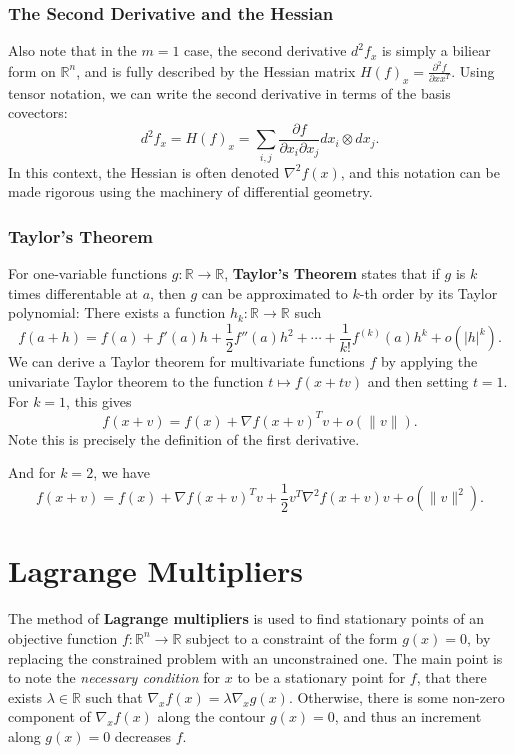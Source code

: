 \documentclass[reqno]{amsart}
\numberwithin{equation}{section}
\begin{document}
\subsubsection{The Second Derivative and the Hessian}

Also note that in the $m=1$ case, the second derivative $d^2f_x$ is simply a biliear form
on $\mathbb R^n$, and is fully described by the Hessian matrix $H(f)_x =
\frac{\partial^2 f}{\partial x x ^T}$. Using tensor notation, we can write the second derivative
in terms of the basis covectors:
$$
    d^2f_x = H(f)_x = \sum_{i,j} \frac{\partial f}{\partial x_i \partial x_j} dx_i \otimes dx_j.
$$
In this context, the Hessian is often denoted $\nabla^2f(x)$, and this notation can be made
rigorous using the machinery of differential geometry.

\subsubsection{Taylor's Theorem}

For one-variable functions $g : \mathbb R \to \mathbb R$, \textbf{Taylor's Theorem} states
that if $g$ is $k$ times differentable at $a$, then $g$ can be approximated to $k$-th
order by its Taylor polynomial: There exists a function $h_k : \mathbb R \to \mathbb R$ such
$$
    f(a+h) = f(a) + f'(a)h + \frac12 f''(a)h^2 + \cdots + \frac{1}{k!} f^{(k)}(a) h^k +
        o(|h|^k).
$$
We can derive a Taylor theorem for multivariate functions $f$ by applying the univariate Taylor
theorem to the function $t \mapsto f(x + tv)$ and then setting $t=1$. For $k=1$, this gives
$$
    f(x + v) = f(x) + \nabla f(x+v)^T v + o(\|v\|).
$$
Note this is precisely the definition of the first derivative.

And for $k=2$, we have
$$
    f(x + v) = f(x) + \nabla f(x+v)^T v + \frac{1}{2} v^T \nabla^2 f(x+v) v + o(\|v\|^2).
$$

\section{Lagrange Multipliers}

The method of \textbf{Lagrange multipliers} is used to find stationary points of an objective
function $f: \mathbb R^n \to \mathbb R$ subject to a constraint of the form $g(x) = 0$,
by replacing the constrained problem with an unconstrained one.
The main point is to note the \emph{necessary condition}
for $x$ to be a stationary point for $f$, that there exists $\lambda \in \mathbb R$ such that
$\nabla_x f(x) = \lambda \nabla_x g(x)$. Otherwise, there is some non-zero component
of $\nabla_x f(x)$ along the contour $g(x) = 0$, and thus an increment along $g(x) = 0$
decreases $f$.
\end{document}
